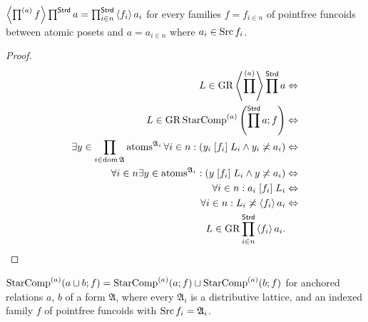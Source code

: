 \begin{thm}
\label{prod-prod}$\left\langle \prod^{(a)}f\right\rangle\prod^{\mathsf{Strd}}a=\prod_{i\in n}^{\mathsf{Strd}}\left\langle f_{i}\right\rangle a_{i}$
for every families $f=f_{i\in n}$ of pointfree funcoids between atomic
posets and $a=a_{i\in n}$ where $a_{i}\in\operatorname{Src} f_{i}$.\end{thm}
\begin{proof}
~
\begin{align*}
L\in\operatorname{GR}\left\langle \prod^{(a)}\right\rangle\prod^{\mathsf{Strd}}a & \Leftrightarrow\\
L\in\operatorname{GR}\operatorname{StarComp}^{(a)}\left(\prod^{\mathsf{Strd}}a;f\right) & \Leftrightarrow\\
\exists y\in\prod_{i\in\operatorname{dom}\mathfrak{A}}\operatorname{atoms}^{\mathfrak{A}_{i}}\forall i\in n:(y_{i}\mathrel{\left[f_{i}\right]}L_{i}\land y_{i}\not\asymp a_{i}) & \Leftrightarrow\\
\forall i\in n\exists y\in\operatorname{atoms}^{\mathfrak{A}_{i}}:(y\mathrel{\left[f_{i}\right]}L_{i}\land y\not\asymp a_{i}) & \Leftrightarrow\\
\forall i\in n:a_{i}\mathrel{\left[f_{i}\right]}L_{i} & \Leftrightarrow\\
\forall i\in n:L_{i}\not\asymp\left\langle f_{i}\right\rangle a_{i} & \Leftrightarrow\\
L\in\operatorname{GR}\prod_{i\in n}^{\mathsf{Strd}}\left\langle f_{i}\right\rangle a_{i}.
\end{align*}
\end{proof}
\begin{conjecture}
$\operatorname{StarComp}^{(a)}(a\sqcup b;f)=\operatorname{StarComp}^{(a)}(a;f)\sqcup\operatorname{StarComp}^{(a)}(b;f)$
for anchored relations $a$, $b$ of a form $\mathfrak{A}$, where
every $\mathfrak{A}_{i}$ is a distributive lattice, and an indexed
family $f$ of pointfree funcoids with $\operatorname{Src} f_{i}=\mathfrak{A}_{i}$.
\end{conjecture}

